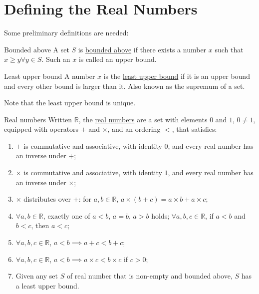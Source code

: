 \documentclass[../Main.tex]{subfiles}
\begin{document}
\section{Defining the Real Numbers}
Some preliminary definitions are needed:
\begin{definition}{Bounded above}
    A set $S$ is \underline{bounded above} if there exists a number $x$ such that $x\geq y \forall y \in S$. Such an $x$ is called an upper bound.
\end{definition}
\begin{definition}{Least upper bound}
    A number $x$ is the \underline{least upper bound} if it is an upper bound and every other bound is larger than it. Also known as the supremum of a set.
\end{definition}
Note that the least upper bound is unique.
\begin{definition}{Real numbers}
    Written $\mathbb{R}$, the \underline{real numbers} are a set with elements $0$ and $1$, $0\neq 1$, equipped with operators $+$ and $\times$, and an ordering $<$, that satisfies:
    \begin{enumerate}
        \item $+$ is commutative and associative, with identity $0$, and every real number has an inverse under $+$;\label{realAxiomAddition}
        \item $\times$ is commutative and associative, with identity $1$, and every real number has an inverse under $\times$;\label{realAxiomMultn}
        \item $\times$ distributes over $+$: for $a, b \in \mathbb{R}$, $a\times(b+c)=a\times b + a \times c$;\label{realAxiomDist}
        \item $\forall a, b \in \mathbb{R}$, exactly one of $a<b$, $a=b$, $a>b$ holds; $\forall a, b, c \in \mathbb{R}$, if $a<b$ and $b<c$, then $a<c$;\label{realAxiomOrdering}
        \item $\forall a, b, c \in \mathbb{R}$, $a<b \implies a+c<b+c$;\label{realAxiomAddOrder}
        \item $\forall a, b, c \in \mathbb{R}$, $a<b \implies a\times c<b\times c$ if $c>0$;\label{realAxiomMultOrder}
        \item Given any set $S$ of real number that is non-empty and bounded above, $S$ has a least upper bound.\label{realAxiomLUB}
    \end{enumerate}
\end{definition}
\end{document}
